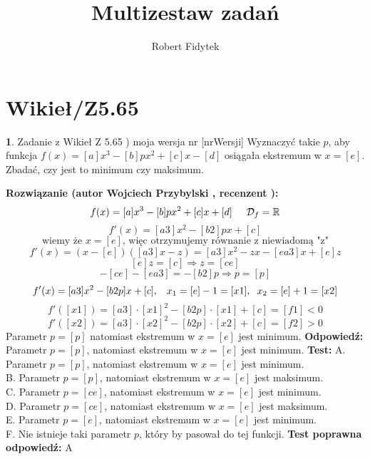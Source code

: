\documentclass[12pt, a4paper]{article}
\title{Multizestaw zadań}
\author{Robert Fidytek}
\date{}
\theoremstyle{definition} %
\newtheorem{zad}{}
\newcommand{\kategoria}[1]{\section{#1}} %
\newcommand{\zadStart}[1]{\begin{zad}#1\newline} %
\newcommand{\zadStop}{\end{zad}}   %
\newcommand{\rozwStart}[2]{\noindent \textbf{Rozwiązanie (autor #1 , recenzent #2): }\newline} %
\newcommand{\rozwStop}{\newline}                                            %
\newcommand{\odpStart}{\noindent \textbf{Odpowiedź:}\newline}    %
\newcommand{\odpStop}{\newline}                                             %
\newcommand{\testStart}{\noindent \textbf{Test:}\newline} %
\newcommand{\testStop}{\newline} %
\newcommand{\kluczStart}{\noindent \textbf{Test poprawna odpowiedź:}\newline} %
\newcommand{\kluczStop}{\newline} %
\begin{document}
\maketitle


\kategoria{Wikieł/Z5.65}
\zadStart{Zadanie z Wikieł Z 5.65 ) moja wersja nr [nrWersji]}
Wyznaczyć takie $p$, aby funkcja $f(x)=[a]x^{3}-[b]px^{2}+[c]x-[d]$ osiągała ekstremum w $x=[e]$. Zbadać, czy jest to minimum czy maksimum.
\zadStop
\rozwStart{Wojciech Przybylski}{}
$$ f(x)=[a]x^{3}-[b]px^{2}+[c]x+[d]\hspace{5mm} \mathcal{D}_{f}=\mathbb{R}$$
$$ f'(x)=[a3]x^{2}-[b2]px+[c]$$
$$\mbox{ wiemy że } x=[e] \mbox{, więc otrzymujemy równanie z niewiadomą "z" }$$
$$f'(x)=(x-[e])([a3]x-z)=[a3]x^{2}-zx-[ea3]x+[e]z$$
$$[e]z=[c]\Rightarrow z=[ce]$$
$$-[ce]-[ea3]=-[b2]p \Rightarrow p=[p]$$
$$f'(x)=[a3]x^{2}-[b2p]x+[c],\hspace{3mm}x_{1}=[e]-1=[x1],\hspace{2mm} x_{2}=[e]+1=[x2]$$
$$f'([x1])=[a3]\cdot[x1]^{2}-[b2p]\cdot[x1]+[c]=[f1]<0$$
$$f'([x2])=[a3]\cdot[x2]^{2}-[b2p]\cdot[x2]+[c]=[f2]>0$$
Parametr $p=[p]$ natomiast ekstremum w $x=[e]$ jest minimum.
\rozwStop
\odpStart
Parametr $p=[p]$, natomiast ekstremum w $x=[e]$ jest minimum.
\odpStop
\testStart
A. Parametr $p=[p]$, natomiast ekstremum w $x=[e]$ jest minimum.\\
B. Parametr $p=[p]$, natomiast ekstremum w $x=[e]$ jest maksimum.\\
C. Parametr $p=[ce]$, natomiast ekstremum w $x=[e]$ jest minimum.\\
D. Parametr $p=[ce]$, natomiast ekstremum w $x=[e]$ jest maksimum.\\
E. Parametr $p=[e]$, natomiast ekstremum w $x=[e]$ jest minimum.\\
F. Nie istnieje taki parametr $p$, który by pasował do tej funkcji.
\testStop
\kluczStart
A
\kluczStop
\end{document}
